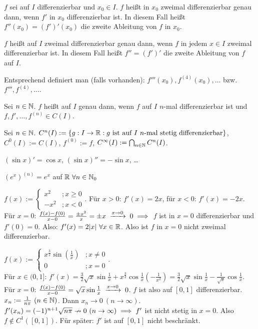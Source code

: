 \documentclass[a4paper,oneside,DIV15,BCOR12mm]{scrbook}
\begin{document}
\begin{definition}
\begin{liste}
\item $f$ sei auf $I$ differenzierbar und $x_0 \in I$. $f$ heißt in $x_0$ zweimal differenzierbar genau dann, wenn $f'$ in $x_0$ differenzierbar ist. In diesem Fall heißt $f''(x_0) = (f')'(x_0)$ die zweite Ableitung von $f$ in $x_0$.
\item $f$ heißt auf $I$ zweimal differenzierbar genau dann, wenn $f$ in jedem $x\in I$ zweimal differenzierbar ist. In diesem Fall heißt $f''=(f')'$ die zweite Ableitung von $f$ auf $I$.
\item Entsprechend definiert man (falls vorhanden): $f'''(x_0), f^{(4)}(x_0),\ldots$ bzw. $f''', f^{(4)}, \ldots$.
\item Sei $n\in\mathbb{N}$. $f$ heißt auf $I$  genau dann, wenn $f$ auf $I$ $n$-mal differenzierbar ist und $f,f',\ldots,f^{(n)}\in C(I)$.
\item Sei $n\in\mathbb{N}$. $C^n(I) := \{ g:  I\to \MdR: g\text{ ist auf }I\ n\text{-mal stetig differenzierbar}\}$, $C^0(I) := C(I)$, $f^{(0)} := f$, $C^\infty(I) := \bigcap_{n\in\mathbb{N}}C^n(I)$.
\end{liste}
\end{definition}

\begin{beispiele}
\item $(\sin x)' = \cos x$, $(\sin x)'' = -\sin x$, \ldots
\item $(e^x)^{(n)} = e^x$ auf $\mathbb{R} \ \forall n\in\mathbb{N}_0$
\item $f(x) := \begin{cases}x^2 &; x\ge0 \\ -x^2 &; x<0\end{cases}$. Für $x>0$: $f'(x) = 2x$, für $x<0$: $f'(x) = -2x$. \\
Für $x=0$: $\frac{f(x)-f(0)}{x-0} = \frac{\pm x^2}{x} = \pm x \tomit{x\to 0} 0 \folgt$ $f$ ist in $x=0$ differenzierbar und $f'(0)=0$. Also: $f'(x)= 2|x|\ \forall x\in\mathbb{R}$. Also ist $f$ in $x=0$ nicht zweimal differenzierbar.
\item $f(x) := \begin{cases}x^{\frac{3}{2}}\sin(\frac{1}{x}) &; x\ne0 \\ 0 &; x=0\end{cases}$.  \\
Für $x\in(0,1]$: $f'(x) = \frac{3}{2}\sqrt{x}\sin\frac{1}{x} + x^{\frac{3}{2}}\cos\frac{1}{x}(-\frac{1}{x^2}) = \frac{3}{2}\sqrt{x}\sin\frac{1}{x} - \frac{1}{\sqrt{x}} \cos \frac{1}{x}$. \\
Für $x=0$: $\frac{f(x)-f(0)}{x-0} = \sqrt{x}\sin\frac{1}{x} \tomit{x\to 0} 0$. $f$ ist also auf $[0,1]$ differenzierbar.\\
$x_n := \frac{1}{n\pi}\ (n\in\mathbb{N})$. Dann $x_n \to 0 \ (n\to\infty)$. $f'(x_n) = (-1)^{n+1}\sqrt{n\pi} \nrightarrow 0 \ (n\to \infty) \implies f'$ ist nicht stetig in $x=0$. Also $f\notin C^1([0,1])$. Für später: $f'$ ist auf $[0,1]$ nicht beschränkt.
\end{beispiele}
\end{document}
